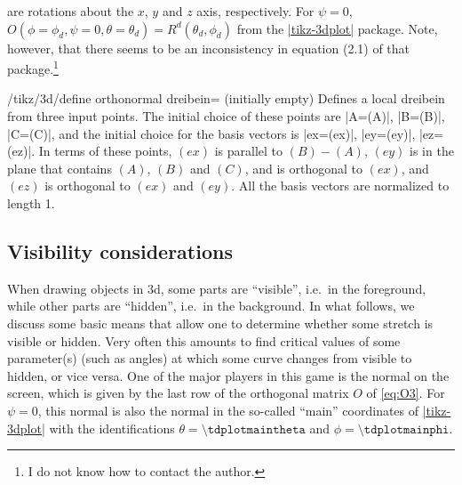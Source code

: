 \documentclass[a4paper,fleqn]{ltxdoc}
\begin{document}
are rotations about the $x$, $y$ and $z$ axis, respectively.  For $\psi=0$,
$O(\phi=\phi_d,\psi=0,\theta=\theta_d)=R^d(\theta_d,\phi_d)$ from the
\href{https://ctan.org/pkg/tikz-3dplot?lang=en}{|tikz-3dplot|} package. Note,
however, that there seems to be an inconsistency in equation (2.1) of that
package.\footnote{I do not know how to contact the author.}

\begin{codeexample}[width=2.5cm,preamble={\usetikzlibrary{3dtools}}]
\end{codeexample}

\begin{key}{/tikz/3d/define orthonormal dreibein= (initially empty)}
		Defines a local dreibein from three input points. The initial choice of
		these points are |A=(A)|, |B=(B)|, |C=(C)|, and the initial choice for
		the basis vectors is |ex=(ex)|, |ey=(ey)|, |ez=(ez)|. In terms of these
		points, $(ex)$ is parallel to $(B)-(A)$, $(ey)$ is in the plane that
		contains $(A)$, $(B)$ and $(C)$, and is orthogonal to $(ex)$, and $(ez)$
		is orthogonal to $(ex)$ and $(ey)$. All the basis vectors are normalized
		to length 1.
\end{key}


\subsection{Visibility considerations}

When drawing objects in 3d, some parts are ``visible'', i.e.\ in the foreground,
while other parts are ``hidden'', i.e.\ in the background. In what follows, we
discuss some basic means that allow one to determine whether some stretch is
visible or hidden. Very often this amounts to find critical values of some
parameter(s) (such as angles) at which some curve changes from visible to
hidden, or vice versa. One of the major players in this game is the normal on
the screen, which is given by the last row of the orthogonal matrix $O$ of
\eqref{eq:O3}. For $\psi=0$, this normal is also the normal in the so-called
``main'' coordinates of 
\href{https://ctan.org/pkg/tikz-3dplot?lang=en}{|tikz-3dplot|} with the
identifications $\theta=\texttt{\textbackslash tdplotmaintheta}$ and
$\phi=\texttt{\textbackslash tdplotmainphi}$.
\end{document}
